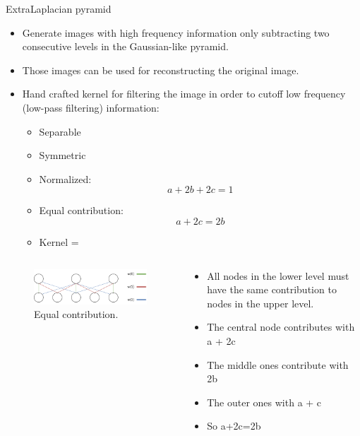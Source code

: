 \documentclass{beamer}
\begin{document}
\begin{frame}{Extra}{Laplacian pyramid\cite{laplacianpyramid}}
    \begin{itemize}
        \small
        \item Generate images with high frequency information only subtracting two consecutive levels in the Gaussian-like pyramid. 
        \item Those images can be used for reconstructing the original image.
        \item Hand crafted kernel for filtering the image in order to cutoff low frequency (low-pass filtering) information:
        \begin{itemize}
            \tiny
            \item Separable
            \item Symmetric
            \item Normalized: $$a + 2b + 2c = 1$$
            \item Equal contribution: $$a + 2c = 2b$$
            \item Kernel = 
        \end{itemize}
    \end{itemize}
    \begin{columns}
        \begin{column}{0.3\textwidth}
            \begin{figure}
                \centering
                \includegraphics[scale=0.2]{laplacianpyramidexample.png}
                \caption{Equal contribution.}
            \end{figure}        
        \end{column}
        \begin{column}{0.6\textwidth}
            \begin{itemize}
                \tiny
                \item All nodes in the lower level must have the same contribution to nodes in the upper level. 
                \item The central node contributes with a + 2c
                \item The middle ones contribute with 2b
                \item The outer ones with a + c
                \item So a+2c=2b
            \end{itemize}
        \end{column}
    \end{columns}    
\end{frame}



\end{document}
